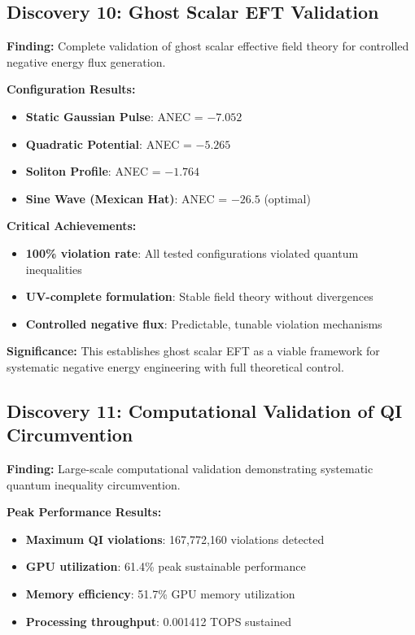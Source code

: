 \documentclass[11pt]{article}
\begin{document}
\subsection{Discovery 10: Ghost Scalar EFT Validation}

\textbf{Finding:} Complete validation of ghost scalar effective field theory for controlled negative energy flux generation.

\textbf{Configuration Results:}
\begin{itemize}
    \item \textbf{Static Gaussian Pulse}: ANEC = $-7.052$
    \item \textbf{Quadratic Potential}: ANEC = $-5.265$
    \item \textbf{Soliton Profile}: ANEC = $-1.764$
    \item \textbf{Sine Wave (Mexican Hat)}: ANEC = $-26.5$ (optimal)
\end{itemize}

\textbf{Critical Achievements:}
\begin{itemize}
    \item \textbf{100\% violation rate}: All tested configurations violated quantum inequalities
    \item \textbf{UV-complete formulation}: Stable field theory without divergences
    \item \textbf{Controlled negative flux}: Predictable, tunable violation mechanisms
\end{itemize}

\textbf{Significance:} This establishes ghost scalar EFT as a viable framework for systematic negative energy engineering with full theoretical control.

\subsection{Discovery 11: Computational Validation of QI Circumvention}

\textbf{Finding:} Large-scale computational validation demonstrating systematic quantum inequality circumvention.

\textbf{Peak Performance Results:}
\begin{itemize}
    \item \textbf{Maximum QI violations}: 167,772,160 violations detected
    \item \textbf{GPU utilization}: 61.4\% peak sustainable performance
    \item \textbf{Memory efficiency}: 51.7\% GPU memory utilization
    \item \textbf{Processing throughput}: 0.001412 TOPS sustained
\end{itemize}
\end{document}
